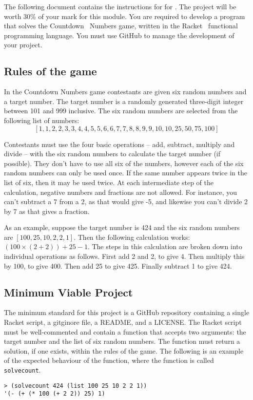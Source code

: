 \noindent
The following document contains the instructions for \projectname{} for \modulename{}.
The project will be worth 30\% of your mark for this module.
You are required to develop a program that solves the Countdown~\cite{countdownwebsite} Numbers game, written in the Racket~\cite{racketwebsite} functional programming language.
You must use GitHub to manage the development of your project.

\subsection*{Rules of the game}
In the Countdown Numbers game contestants are given six random numbers and a target number.
The target number is a randomly generated three-digit integer between 101 and 999 inclusive.
The six random numbers are selected from the following list of numbers:
\[ [ 1 , 1 , 2 , 2 , 3 , 3 , 4 , 4 , 5 , 5 , 6 , 6 , 7 , 7 , 8 , 8 , 9 , 9 , 10 , 10, 25, 50, 75, 100 ]\]

Contestants must use the four basic operations -- add, subtract, multiply and divide -- with the six random numbers to calculate the target number (if possible).
They don't have to use all six of the numbers, however each of the six random numbers can only be used once.
If the same number appears twice in the list of six, then it may be used twice.
At each intermediate step of the calculation, negative numbers and fractions are not allowed.
For instance, you can't subtract a 7 from a 2, as that would give -5, and likewise you can't divide 2 by 7 as that gives a fraction.

As an example, suppose the target number is 424 and the six random numbers are $[100, 25, 10, 2, 2, 1]$.
Then the following calculation works: $(100 \times (2 + 2)) + 25 - 1$.
The steps in this calculation are broken down into individual operations as follows.
First add 2 and 2, to give 4.
Then multiply this by 100, to give 400.
Then add 25 to give 425.
Finally subtract 1 to give 424.

\subsection*{Minimum Viable Project}
The minimum standard for this project is a GitHub repository containing a single Racket script, a gitginore file, a README, and a LICENSE.
The Racket script must be well-commented and contain a function that accepts two arguments: 
the target number and the list of six random numbers.
The function must return a solution, if one exists, within the rules of the game.
The following is an example of the expected behaviour of the function, where the function is called \texttt{solvecount}.
\begin{verbatim}
> (solvecount 424 (list 100 25 10 2 2 1))
'(- (+ (* 100 (+ 2 2)) 25) 1)
\end{verbatim}

